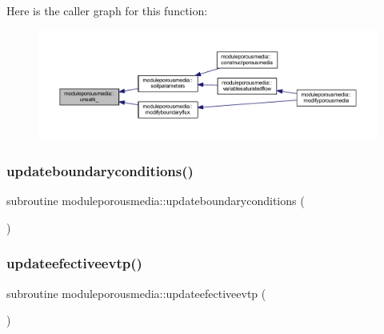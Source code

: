 Here is the caller graph for this function\+:\nopagebreak
\begin{figure}[H]
\begin{center}
\leavevmode
\includegraphics[width=350pt]{namespacemoduleporousmedia_a27a116705cfa7c67ac33a00726529cfa_icgraph}
\end{center}
\end{figure}
\mbox{\label{namespacemoduleporousmedia_ab48cf69fc08a66f3d4cfa5d9624e5ebf}} 
\subsubsection{\texorpdfstring{updateboundaryconditions()}{updateboundaryconditions()}}
{\footnotesize\ttfamily subroutine moduleporousmedia\+::updateboundaryconditions (\begin{DoxyParamCaption}{ }\end{DoxyParamCaption})\hspace{0.3cm}{\ttfamily [private]}}

\mbox{\label{namespacemoduleporousmedia_a06efe35a5a85d34f8db82ebe144c1def}} 
\subsubsection{\texorpdfstring{updateefectiveevtp()}{updateefectiveevtp()}}
{\footnotesize\ttfamily subroutine moduleporousmedia\+::updateefectiveevtp (\begin{DoxyParamCaption}{ }\end{DoxyParamCaption})\hspace{0.3cm}{\ttfamily [private]}}

